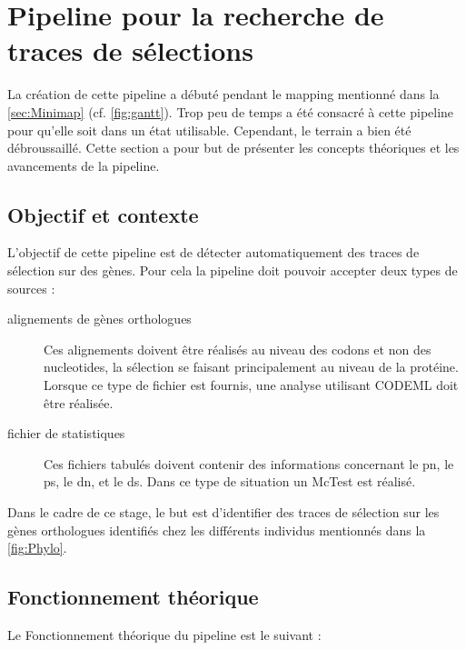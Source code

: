 \documentclass[../main]{subfiles} %
\begin{document}
\addto\extrasfrench{\protected\edef:{\unexpanded\expandafter{:}}}

\section{Pipeline pour la recherche de traces de sélections}
\label{sec:PipelineTrace}
La création de cette pipeline a débuté pendant le \gls{mapping} mentionné dans la \cref{sec:Minimap} (cf. \cref{fig:gantt}). Trop peu de temps a été consacré à cette pipeline pour qu'elle soit dans un état utilisable. Cependant, le terrain a bien été débroussaillé. Cette section a pour but de présenter les concepts théoriques et les avancements de la pipeline.

\subsection{Objectif et contexte}
L'objectif de cette pipeline est de détecter automatiquement des traces de sélection sur des gènes. Pour cela la pipeline doit pouvoir accepter deux types de sources :

\begin{description}
    \item[alignements de gènes \glspl{orthologue}] Ces alignements doivent être réalisés au niveau des \glspl{codon} et non des \glspl{nucleotide}, la sélection se faisant principalement au niveau de la protéine. Lorsque ce type de fichier est fournis, une analyse utilisant \gls{CODEML} doit être réalisée.
    
    \item[fichier de statistiques] Ces fichiers tabulés doivent contenir des informations concernant le \acrshort{pn}, le \acrshort{ps}, le \acrshort{dn}, et le \acrshort{ds}. Dans ce type de situation un \gls{McTest} est réalisé.
\end{description}

Dans le cadre de ce stage, le but est d'identifier des traces de sélection sur les gènes \glspl{orthologue} identifiés chez les différents individus mentionnés dans la \cref{fig:Phylo}.

\subsection{Fonctionnement théorique}
\label{sec:PipelineFoncionnement}
Le Fonctionnement théorique du pipeline est le suivant :
\end{document}
